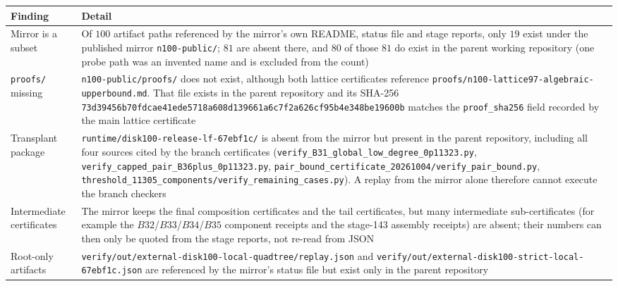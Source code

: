 \begin{center}
\footnotesize
\begin{tabular}{@{}>{\raggedright\arraybackslash}p{}>{\raggedright\arraybackslash}p{}@{}}
\toprule
Finding & Detail \\
\midrule
Mirror is a subset & Of $100$ artifact paths referenced by the mirror's own README, status file and
stage reports, only $19$ exist under the published mirror \texttt{n100-\allowbreak{}public/\allowbreak{}}; $81$ are absent
there, and $80$ of those $81$ do exist in the parent working repository (one probe path was an
invented name and is excluded from the count) \\
\texttt{proofs/\allowbreak{}} missing & \texttt{n100-\allowbreak{}public/\allowbreak{}proofs/\allowbreak{}} does not exist, although both lattice
certificates reference
\texttt{proofs/\allowbreak{}n100-\allowbreak{}lattice97-\allowbreak{}algebraic-\allowbreak{}upperbound.\allowbreak{}md}.
That file exists in the parent repository and its SHA-256
\texttt{73d39456b70fdcae\allowbreak{}41ede5718a608d13\allowbreak{}9661a6c7f2a6\allowbreak{}26cf95b4e348be19\allowbreak{}600b}
matches the \texttt{proof\_\allowbreak{}sha256} field recorded by the main lattice certificate \\
Transplant package & \texttt{runtime/\allowbreak{}disk100-\allowbreak{}release-\allowbreak{}lf-\allowbreak{}67ebf1c/\allowbreak{}} is absent from the mirror but
present in the parent repository, including all four sources cited by the branch certificates
(\texttt{verify\_\allowbreak{}B31\_\allowbreak{}global\_\allowbreak{}low\_\allowbreak{}degree\_\allowbreak{}0p11323.py},
\texttt{verify\_\allowbreak{}capped\_\allowbreak{}pair\_\allowbreak{}B36plus\_\allowbreak{}0p11323.py},
{\footnotesize\texttt{pair\_\allowbreak{}bound\_\allowbreak{}certificate\_\allowbreak{}20261004/\allowbreak{}verify\_\allowbreak{}pair\_\allowbreak{}bound.py}},
\texttt{threshold\_\allowbreak{}11305\_\allowbreak{}components/\allowbreak{}verify\_\allowbreak{}remaining\_\allowbreak{}cases.py}). A replay from the mirror alone
therefore cannot execute the branch checkers \\
Intermediate certificates & The mirror keeps the final composition certificates and the tail
certificates, but many intermediate sub-certificates (for example the $B32$/$B33$/$B34$/$B35$
component receipts and the stage-143 assembly receipts) are absent; their numbers can then only be
quoted from the stage reports, not re-read from JSON \\
Root-only artifacts & \texttt{verify/\allowbreak{}out/\allowbreak{}external-\allowbreak{}disk100-\allowbreak{}local-\allowbreak{}quadtree/\allowbreak{}replay.json} and
{\footnotesize\texttt{verify/\allowbreak{}out/\allowbreak{}external-\allowbreak{}disk100-\allowbreak{}strict-\allowbreak{}local-\allowbreak{}67ebf1c.json}} are referenced by the mirror's status
file but exist only in the parent repository \\
\bottomrule
\end{tabular}
\end{center}

